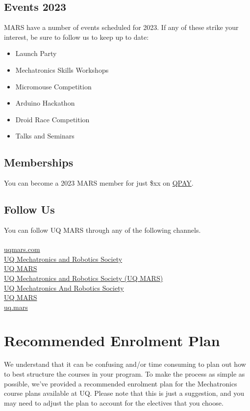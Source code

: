 \documentclass[a4paper,12pt]{report}
\begin{document}
\section{Events 2023}
MARS have a number of events scheduled for 2023. If any of these strike your interest, be sure to follow us to keep up to date:
\begin{itemize}
    \item Launch Party
    \item Mechatronics Skills Workshops
    \item Micromouse Competition
    \item Arduino Hackathon
    \item Droid Race Competition
    \item Talks and Seminars
\end{itemize}

\section{Memberships}
You can become a 2023 MARS member for just \$xx on \href{https://uqmars.getqpay.com/}{QPAY}.

\section{Follow Us}
You can follow UQ MARS through any of the following channels. \\ \\
\faLink{} \href{https://www.uqmars.com}{uqmars.com} \\
\faDiscord{} \href{https://discord.gg/vjY49Q8}{UQ Mechatronics and Robotics Society} \\
\faFacebookSquare{} \href{https://facebook.com/UQMARS}{UQ MARS} \\
\faLinkedin{} \href{https://linkedin.com/company/uq-mars}{UQ Mechatronics and Robotics Society (UQ MARS)} \\
\faGithubSquare{} \href{https://github.com/uqmars}{UQ Mechatronics And Robotics Society} \\
\faYoutube{} \href{https://www.youtube.com/channel/UCH3GjoKLL3R_1ayjkn9C78A}{UQ MARS} \\
\faInstagram{} \href{https://www.instagram.com/uq.mars/}{uq.mars} \\



\chapter{Recommended Enrolment Plan}
We understand that it can be confusing and/or time consuming to plan out how to best structure the courses in your program. To make the process as simple as possible, we've provided a recommended enrolment plan for the Mechatronics course plans available at UQ. Please note that this is just a suggestion, and you may need to adjust the plan to account for the electives that you choose.
\end{document}
